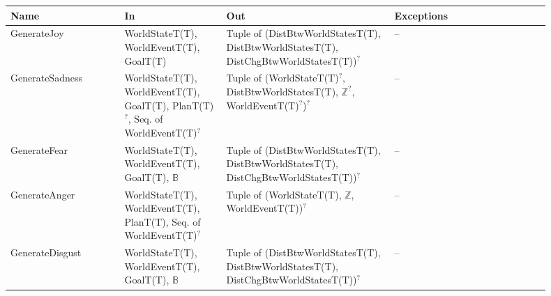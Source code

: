 \begin{center}
    \small
    \renewcommand{\arraystretch}{1.2}
    \begin{tabular}{m{0.19\linewidth} m{0.17\linewidth} m{0.28\linewidth}
            m{0.26\linewidth}}
        \toprule
        \textbf{Name} & \textbf{In} & \textbf{Out} & \textbf{Exceptions} \\
        \midrule

        \rowcolor[gray]{0.9}GenerateJoy & WorldStateT(T), WorldEventT(T),
        GoalT(T) & Tuple of \newline (DistBtwWorldStatesT(T),
        DistBtwWorldStatesT(T), DistChgBtwWorldStatesT(T))$^?$ & -- \\

        GenerateSadness & WorldStateT(T), WorldEventT(T), GoalT(T),
        PlanT(T)$^?$, Seq. of WorldEventT(T)$^?$ & Tuple of
        (WorldStateT(T)$^?$, \newline DistBtwWorldStatesT(T), \newline
        $\mathbb{Z}^?$, WorldEventT(T)$^?$)$^?$ & -- \\

        \rowcolor[gray]{0.9}GenerateFear & WorldStateT(T), WorldEventT(T),
        GoalT(T), $\mathbb{B}$ & Tuple of \newline (DistBtwWorldStatesT(T),
        DistBtwWorldStatesT(T), DistChgBtwWorldStatesT(T))$^?$ & -- \\

        GenerateAnger & WorldStateT(T), WorldEventT(T), PlanT(T), Seq. of
        WorldEventT(T)$^?$ & Tuple of (WorldStateT(T), \newline $\mathbb{Z}$,
        WorldEventT(T))$^?$ & -- \\

        \rowcolor[gray]{0.9}GenerateDisgust & WorldStateT(T), WorldEventT(T),
        GoalT(T), $\mathbb{B}$ & Tuple of \newline (DistBtwWorldStatesT(T),
        DistBtwWorldStatesT(T), DistChgBtwWorldStatesT(T))$^?$ & -- \\

        \bottomrule
    \end{tabular}
\end{center}


